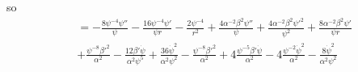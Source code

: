 \documentclass[12pt]{article}
\numberwithin{equation}{section}
\begin{document}
so
\begin{equation}
\begin{aligned}
&= -\frac{8 \psi^{-4} \psi''}{\psi} - \frac{16 \psi^{-4} \psi'}{\psi r} - \frac{2 \psi^{-4}}{r^{2}} + \frac{4 \alpha^{-2} \beta^2 \psi''}{\psi} + \frac{4 \alpha^{-2} \beta^2 \psi'^2}{\psi^2}  + \frac{8 \alpha^{-2} \beta^2 \psi'}{\psi r} \\
&+ \frac{\psi^{-8} \beta'^2}{\alpha^2} - \frac{12 \beta' \dot{\psi}}{\alpha^2 \psi^5} + \frac{36 \dot{\psi}^2}{\alpha^2 \psi^2} - \frac{\psi^{-8} \beta'^2}{\alpha^2} + 4 \frac{\psi^{-5} \beta' \dot{\psi}}{\alpha^2} - 4 \frac{\psi^{-2} \dot{\psi}^2}{\alpha^2} - \frac{8 \dot{\psi}^2}{\alpha^2 \psi^{2}} \\
\end{aligned}
\end{equation}
\end{document}
